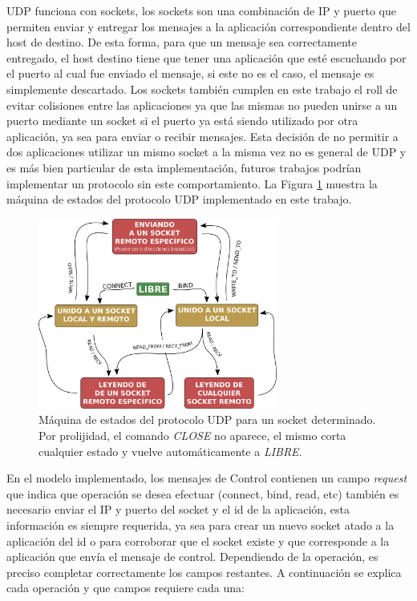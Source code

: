 \documentclass[10pt,a4paper]{article}
\begin{document}
UDP funciona con sockets, los sockets son una combinación de IP y puerto que permiten enviar y entregar los mensajes a la aplicación correspondiente dentro del host de destino. De esta forma, para que un mensaje sea correctamente entregado, el host destino tiene que tener una aplicación que esté escuchando por el puerto al cual fue enviado el mensaje, si este no es el caso, el mensaje es simplemente descartado. Los sockets también cumplen en este trabajo el roll de evitar colisiones entre las aplicaciones ya que las mismas no pueden unirse a un puerto mediante un socket si el puerto ya está siendo utilizado por otra aplicación, ya sea para enviar o recibir mensajes. Esta decisión de no permitir a dos aplicaciones utilizar un mismo socket a la misma vez no es general de UDP y es más bien particular de esta implementación, futuros trabajos podrían implementar un protocolo sin este comportamiento. La Figura \ref{figure: UPD state machine} muestra la máquina de estados del protocolo UDP implementado en este trabajo. \\

\begin{figure}[t]
    \centering
    \includegraphics[width = 0.7\textwidth]{img/png/UDP-state-machine.png}
    \caption{Máquina de estados del protocolo UDP para un socket determinado. Por prolijidad, el comando \textit{CLOSE} no aparece, el mismo corta cualquier estado y vuelve automáticamente a \textit{LIBRE}.}
    \label{figure: UPD state machine}
\end{figure}

\newpage
 
En el modelo implementado, los mensajes de Control contienen un campo \textit{request} que indica que operación se desea efectuar (connect, bind, read, etc) también es necesario enviar el IP y puerto del socket y el id de la aplicación, esta información es siempre requerida, ya sea para crear un nuevo socket atado a la aplicación del id o para corroborar que el socket existe y que corresponde a la aplicación que envía el mensaje de control. Dependiendo de la operación, es preciso completar correctamente los campos restantes. A continuación se explica cada operación y que campos requiere cada una: \\
\end{document}
